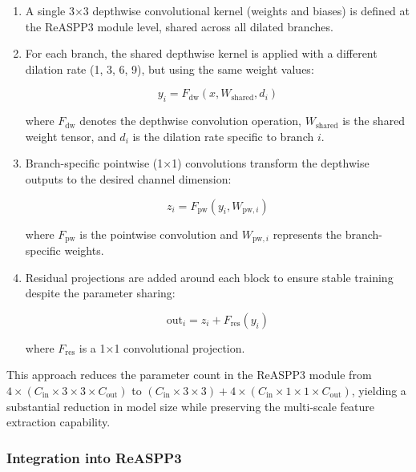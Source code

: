 \documentclass[12pt,a4paper]{article}
\begin{document}
\begin{enumerate}
\item A single 3×3 depthwise convolutional kernel (weights and biases) is defined at the ReASPP3 module level, shared across all dilated branches.

\item For each branch, the shared depthwise kernel is applied with a different dilation rate (1, 3, 6, 9), but using the same weight values:
   
   \begin{equation}
   y_{i} = F_{\textrm{dw}}(x, W_{\textrm{shared}}, d_i)
   \end{equation}
   
   where $F_{\textrm{dw}}$ denotes the depthwise convolution operation, $W_{\textrm{shared}}$ is the shared weight tensor, and $d_i$ is the dilation rate specific to branch $i$.

\item Branch-specific pointwise (1×1) convolutions transform the depthwise outputs to the desired channel dimension:
   
   \begin{equation}
   z_{i} = F_{\textrm{pw}}(y_{i}, W_{\textrm{pw},i})
   \end{equation}
   
   where $F_{\textrm{pw}}$ is the pointwise convolution and $W_{\textrm{pw},i}$ represents the branch-specific weights.

\item Residual projections are added around each block to ensure stable training despite the parameter sharing:
   
   \begin{equation}
   \textrm{out}_{i} = z_{i} + F_{\textrm{res}}(y_{i})
   \end{equation}
   
   where $F_{\textrm{res}}$ is a 1×1 convolutional projection.
\end{enumerate}

This approach reduces the parameter count in the ReASPP3 module from $4 \times (C_{\textrm{in}} \times 3 \times 3 \times C_{\textrm{out}})$ to $(C_{\textrm{in}} \times 3 \times 3) + 4 \times (C_{\textrm{in}} \times 1 \times 1 \times C_{\textrm{out}})$, yielding a substantial reduction in model size while preserving the multi-scale feature extraction capability.

\subsubsection{Integration into ReASPP3}
\end{document}
